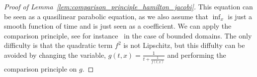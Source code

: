 \documentclass[11pt,a4paper]{article}
\numberwithin{equation}{section}
\theoremstyle{plain}
\theoremstyle{remark}
\newcommand {\f}{\frac}
\begin{document}
\begin{proof}[Proof of Lemma~\ref{lem:comparison_principle_hamilton_jacobi}]
This equation can be seen as a quasilinear parabolic equation, as we also assume that $\inf_{x}$ is just a smooth function of time and is just seen as a coefficient. We can apply the comparison principle, see for instance~\cite{} in the case of bounded domains. The only difficulty is that the quadratic term $f^2$ is not Lipschitz, but this diffulty can be avoided by changing the variable, $g(t,x)=\f{1}{t+\f{1}{f(t,x)}}$ and performing the comparison principle on $g$.
\end{proof}

\fi








\end{document}
